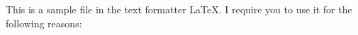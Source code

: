 \documentclass{article}
\begin{document}
This is a sample file in the text formatter \LaTeX.
I require you to use it for the following reasons:
\end{document}
